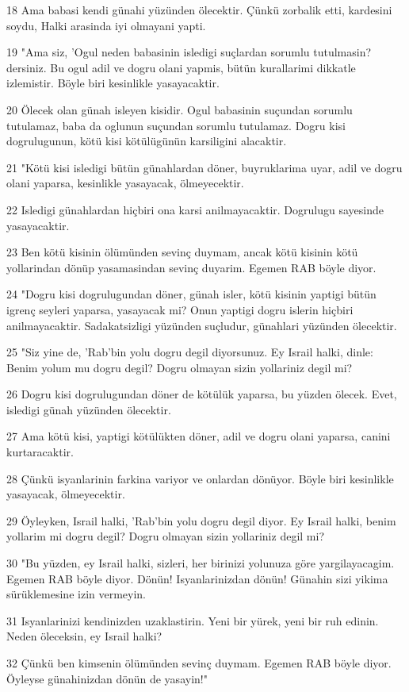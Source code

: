 \par 18 Ama babasi kendi günahi yüzünden ölecektir. Çünkü zorbalik etti, kardesini soydu, Halki arasinda iyi olmayani yapti.
\par 19 "Ama siz, 'Ogul neden babasinin isledigi suçlardan sorumlu tutulmasin? dersiniz. Bu ogul adil ve dogru olani yapmis, bütün kurallarimi dikkatle izlemistir. Böyle biri kesinlikle yasayacaktir.
\par 20 Ölecek olan günah isleyen kisidir. Ogul babasinin suçundan sorumlu tutulamaz, baba da oglunun suçundan sorumlu tutulamaz. Dogru kisi dogrulugunun, kötü kisi kötülügünün karsiligini alacaktir.
\par 21 "Kötü kisi isledigi bütün günahlardan döner, buyruklarima uyar, adil ve dogru olani yaparsa, kesinlikle yasayacak, ölmeyecektir.
\par 22 Isledigi günahlardan hiçbiri ona karsi anilmayacaktir. Dogrulugu sayesinde yasayacaktir.
\par 23 Ben kötü kisinin ölümünden sevinç duymam, ancak kötü kisinin kötü yollarindan dönüp yasamasindan sevinç duyarim. Egemen RAB böyle diyor.
\par 24 "Dogru kisi dogrulugundan döner, günah isler, kötü kisinin yaptigi bütün igrenç seyleri yaparsa, yasayacak mi? Onun yaptigi dogru islerin hiçbiri anilmayacaktir. Sadakatsizligi yüzünden suçludur, günahlari yüzünden ölecektir.
\par 25 "Siz yine de, 'Rab'bin yolu dogru degil diyorsunuz. Ey Israil halki, dinle: Benim yolum mu dogru degil? Dogru olmayan sizin yollariniz degil mi?
\par 26 Dogru kisi dogrulugundan döner de kötülük yaparsa, bu yüzden ölecek. Evet, isledigi günah yüzünden ölecektir.
\par 27 Ama kötü kisi, yaptigi kötülükten döner, adil ve dogru olani yaparsa, canini kurtaracaktir.
\par 28 Çünkü isyanlarinin farkina variyor ve onlardan dönüyor. Böyle biri kesinlikle yasayacak, ölmeyecektir.
\par 29 Öyleyken, Israil halki, 'Rab'bin yolu dogru degil diyor. Ey Israil halki, benim yollarim mi dogru degil? Dogru olmayan sizin yollariniz degil mi?
\par 30 "Bu yüzden, ey Israil halki, sizleri, her birinizi yolunuza göre yargilayacagim. Egemen RAB böyle diyor. Dönün! Isyanlarinizdan dönün! Günahin sizi yikima sürüklemesine izin vermeyin.
\par 31 Isyanlarinizi kendinizden uzaklastirin. Yeni bir yürek, yeni bir ruh edinin. Neden öleceksin, ey Israil halki?
\par 32 Çünkü ben kimsenin ölümünden sevinç duymam. Egemen RAB böyle diyor. Öyleyse günahinizdan dönün de yasayin!"

